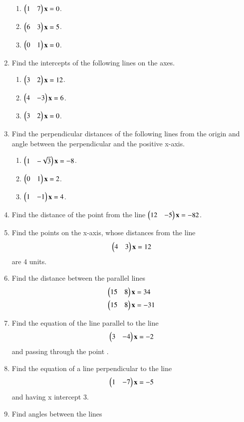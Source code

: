 \begin{enumerate}[label=\arabic*.,ref=\thesubsection.\theenumi]
\begin{enumerate}
\item $\begin{pmatrix}1 & 7\end{pmatrix}\mathbf{x} = 0$.
\item $\begin{pmatrix}6 & 3\end{pmatrix}\mathbf{x} = 5$.
\item $\begin{pmatrix}0 & 1\end{pmatrix}\mathbf{x} = 0$.
\end{enumerate}
\item Find the intercepts of the following  lines on the axes.
\begin{enumerate}
\item $\begin{pmatrix}3 & 2\end{pmatrix}\mathbf{x} = 12$.
\item $\begin{pmatrix}4 & -3\end{pmatrix}\mathbf{x} = 6$.
\item $\begin{pmatrix}3 & 2\end{pmatrix}\mathbf{x} = 0$.
\end{enumerate}
\item Find the perpendicular distances of the following lines from the origin and angle between the perpendicular and the positive x-axis.
\begin{enumerate}
\item $\begin{pmatrix}1 & -\sqrt{3}\end{pmatrix}\mathbf{x} = -8$.
\item $\begin{pmatrix}0 & 1\end{pmatrix}\mathbf{x} = 2$.
\item $\begin{pmatrix}1 & -1\end{pmatrix}\mathbf{x} = 4$.
\end{enumerate}
\item Find the distance of the point  from the line $\begin{pmatrix}12 & -5\end{pmatrix}\mathbf{x} = -82$.
\item Find the points on the x-axis, whose distances from the line 
\begin{align}
\begin{pmatrix}4 & 3\end{pmatrix} \mathbf{x} = 12
\end{align}
are 4 units.
%
\item Find the distance between the parallel lines
%
\begin{align}
\begin{pmatrix}15 & 8\end{pmatrix}\mathbf{x} &= 34
\\
\begin{pmatrix}15 & 8\end{pmatrix}\mathbf{x} &= -31
\end{align}
\item Find the equation of the line parallel to the line 
\begin{align}
\begin{pmatrix}3 & -4\end{pmatrix}\mathbf{x} = -2
\end{align}
%
and passing through the point .
\item Find the equation of a line perpendicular to the line 
\begin{align}
\begin{pmatrix}1 & -7\end{pmatrix}\mathbf{x} = -5
\end{align}
and having x intercept 3.
\item Find angles between the lines

\end{enumerate}
